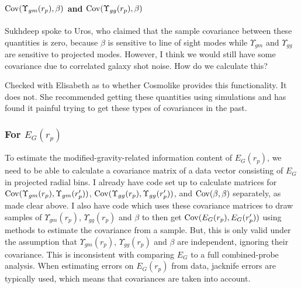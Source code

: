 \documentclass[onecolumn,amsmath,aps,fleqn, superscriptaddress]{revtex4}
\begin{document}
\vspace{2mm}

\paragraph*{${\rm Cov}(\Upsilon_{gm}(r_p),\beta)$ and ${\rm Cov}(\Upsilon_{gg}(r_p),\beta)$}

Sukhdeep spoke to Uros, who claimed that the sample covariance between these quantities is zero, because $\beta$ is sensitive to line of sight modes while $\Upsilon_{gm}$ and $\Upsilon_{gg}$ are sensitive to projected modes. However, I think we would still have some covariance due to correlated galaxy shot noise. How do we calculate this?

Checked with Elisabeth as to whether Cosmolike provides this functionality. It does not. She recommended getting these quantities using simulations and has found it painful trying to get these types of covariances in the past.


\subsubsection{For $E_G(r_p)$}
To estimate the modified-gravity-related information content of $E_G(r_p)$, we need to be able to calculate a covariance matrix of a data vector consisting of $E_G$ in projected radial bins. I already have code set up to calculate matrices for ${\rm Cov}(\Upsilon_{gm}(r_p),\Upsilon_{gm}(r_p^\prime))$, ${\rm Cov}(\Upsilon_{gg}(r_p),\Upsilon_{gg}(r_p^\prime))$, and 
${\rm Cov}(\beta, \beta)$ separately, as made clear above. I also have code which uses these covariance matrices to draw samples of $\Upsilon_{gm}(r_p)$, $\Upsilon_{gg}(r_p)$ and $\beta$ to then get ${\rm Cov}(E_G(r_p), E_G(r_p^\prime))$ using methods to estimate the covariance from a sample. But, this is only valid under the assumption that $\Upsilon_{gm}(r_p)$, $\Upsilon_{gg}(r_p)$ and $\beta$ are independent, ignoring their covariance. This is inconsistent with comparing $E_G$ to a full combined-probe analysis. When estimating errors on $E_G(r_p)$ from data, jacknife errors are typically used, which means that covariances are taken into account.
\end{document}
